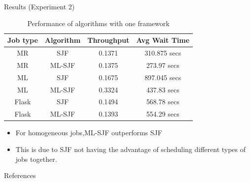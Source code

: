 \documentclass[unknownkeysallowed, final]{beamer}
\begin{document}
\begin{frame}
\begin{columns}[t]
\begin{column}{.29\linewidth}
\vspace{.16cm}
\begin{block}{Results (Experiment 2)}

\begin{table}[h]
\begin{tabular}{|c|c|c|c|}
\hline
    \textbf{Job type} & \textbf{Algorithm} & \textbf{Throughput} & \textbf{Avg Wait Time} \\\hline
    MR & SJF & 0.1371 & 310.875 secs \\\hline
    MR & ML-SJF & 0.1375 & 273.97 secs \\\hline
    ML & SJF & 0.1675 & 897.045 secs \\\hline
    ML & ML-SJF & 0.3324 & 437.83 secs \\\hline
    Flask & SJF & 0.1494  & 568.78 secs \\\hline
    Flask & ML-SJF & 0.1393  & 554.29 secs \\\hline
\end{tabular}
\caption{Performance of algorithms with one framework}
\label{individual-jobs}
\end{table}
\begin{itemize}
	\item For homogeneous jobs,ML-SJF outperforms SJF
	\item This is due to SJF not having the advantage of scheduling different types of jobs together.
\end{itemize}
\vspace{-.4cm}
\end{block}

\vspace{.16cm}
\begin{block}{References}


\scriptsize

\end{block}


\end{column}


\end{columns}
\end{frame}
\end{document}

